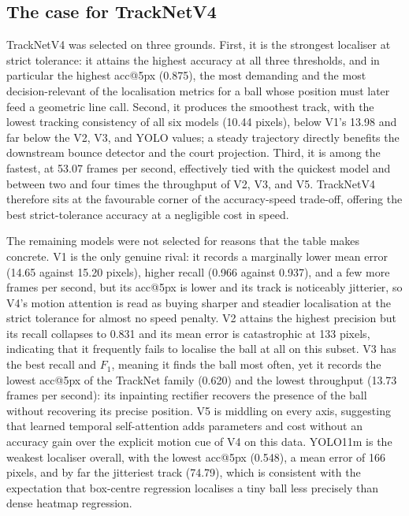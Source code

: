 \subsection{The case for TrackNetV4}
\label{sec:ball-selection-why}

TrackNetV4 was selected on three grounds. First, it is the strongest localiser
at strict tolerance: it attains the highest accuracy at all three thresholds,
and in particular the highest acc@5px (0.875), the most demanding and the most
decision-relevant of the localisation metrics for a ball whose position must
later feed a geometric line call. Second, it produces the smoothest track, with
the lowest tracking consistency of all six models (10.44 pixels), below V1's
13.98 and far below the V2, V3, and YOLO values; a steady trajectory directly
benefits the downstream bounce detector and the court projection. Third, it is
among the fastest, at 53.07 frames per second, effectively tied with the
quickest model and between two and four times the throughput of V2, V3, and V5.
TrackNetV4 therefore sits at the favourable corner of the accuracy-speed
trade-off, offering the best strict-tolerance accuracy at a negligible cost in
speed.

The remaining models were not selected for reasons that the table makes
concrete. V1 is the only genuine rival: it records a marginally lower mean error
(14.65 against 15.20 pixels), higher recall (0.966 against 0.937), and a few
more frames per second, but its acc@5px is lower and its track is noticeably
jitterier, so V4's motion attention is read as buying sharper and steadier
localisation at the strict tolerance for almost no speed penalty. V2 attains the
highest precision but its recall collapses to 0.831 and its mean error is
catastrophic at 133 pixels, indicating that it frequently fails to localise the
ball at all on this subset. V3 has the best recall and $F_1$, meaning it finds
the ball most often, yet it records the lowest acc@5px of the TrackNet family
(0.620) and the lowest throughput (13.73 frames per second): its inpainting
rectifier recovers the presence of the ball without recovering its precise
position. V5 is middling on every axis, suggesting that learned temporal
self-attention adds parameters and cost without an accuracy gain over the
explicit motion cue of V4 on this data. YOLO11m is the weakest localiser
overall, with the lowest acc@5px (0.548), a mean error of 166 pixels, and by far
the jitteriest track (74.79), which is consistent with the expectation that
box-centre regression localises a tiny ball less precisely than dense heatmap
regression.

